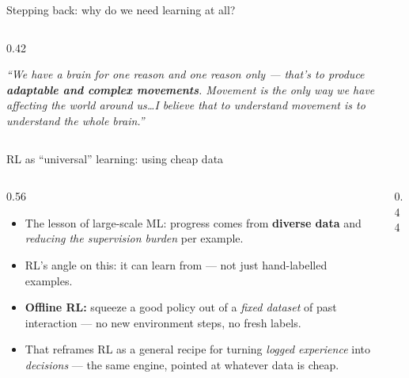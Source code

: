 \begin{frame}{Stepping back: why do we need learning at all?}
\begin{columns}[c]
\begin{column}{0.42\textwidth}
{\begin{minipage}{0.94\linewidth}
\vspace{0.5em}
{\scriptsize\itshape ``We have a brain for one reason and one reason only --- that's to
produce \textbf{adaptable and complex movements}. Movement is the only way we have
affecting the world around us\dots I believe that to understand movement is to understand
the whole brain.''}
\end{minipage}}
\end{column}
\end{columns}
\end{frame}

\begin{frame}{RL as ``universal'' learning: using cheap data}
\begin{columns}[c]
\begin{column}{0.56\textwidth}
\begin{itemize}\footnotesize\itemsep0.5em
    \item The lesson of large-scale ML: progress comes from \textbf{diverse data} and
          \emph{reducing the supervision burden} per example.
    \item RL's angle on this: it can learn from  ---
          not just hand-labelled examples.
    \item \textbf{Offline RL:} squeeze a good policy out of a \emph{fixed dataset}
          of past interaction --- no new environment steps, no fresh labels.
    \item That reframes RL as a general recipe for turning \emph{logged experience} into
          \emph{decisions} --- the same engine, pointed at whatever data is cheap.
\end{itemize}
\end{column}
\begin{column}{0.44\textwidth}
\centering
{}
\end{column}
\end{columns}
\end{frame}

